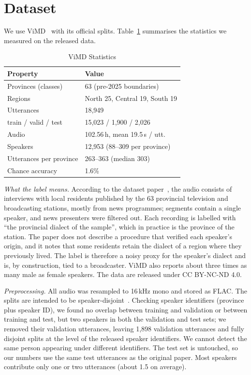 \documentclass[conference]{IEEEtran}
\begin{document}
\section{Dataset}
We use ViMD~\cite{vimd} with its official splits. Table~\ref{tab:data} summarises the statistics we measured on the released data.

\begin{table}[t]
\centering
\caption{ViMD Statistics}
\label{tab:data}
\begin{tabular}{@{}ll@{}}
\toprule
Property & Value \\
\midrule
Provinces (classes) & 63 (pre-2025 boundaries) \\
Regions & North 25, Central 19, South 19 \\
Utterances & 18,949 \\
\quad train / valid / test & 15,023 / 1,900 / 2,026 \\
Audio & 102.56\,h, mean 19.5\,s / utt. \\
Speakers & 12,953 (88--309 per province) \\
Utterances per province & 263--363 (median 303) \\
Chance accuracy & 1.6\% \\
\bottomrule
\end{tabular}
\end{table}

\textit{What the label means.} According to the dataset paper~\cite{vimd}, the audio consists of interviews with local residents published by the 63 provincial television and broadcasting stations, mostly from news programmes; segments contain a single speaker, and news presenters were filtered out. Each recording is labelled with ``the provincial dialect of the sample'', which in practice is the province of the station. The paper does not describe a procedure that verified each speaker's origin, and it notes that some residents retain the dialect of a region where they previously lived. The label is therefore a noisy proxy for the speaker's dialect and is, by construction, tied to a broadcaster. ViMD also reports about three times as many male as female speakers. The data are released under CC BY-NC-ND 4.0.

\textit{Preprocessing.} All audio was resampled to 16\,kHz mono and stored as FLAC. The splits are intended to be speaker-disjoint~\cite{vimd}. Checking speaker identifiers (province plus speaker ID), we found no overlap between training and validation or between training and test, but two speakers in both the validation and test sets; we removed their validation utterances, leaving 1,898 validation utterances and fully disjoint splits at the level of the released speaker identifiers. We cannot detect the same person appearing under different identifiers. The test set is untouched, so our numbers use the same test utterances as the original paper. Most speakers contribute only one or two utterances (about 1.5 on average).
\end{document}
